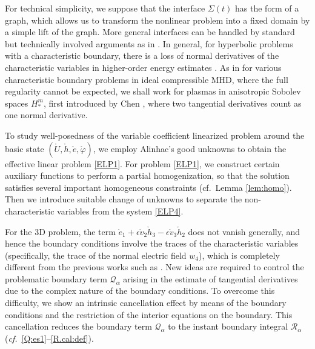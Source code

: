 \documentclass[twoside,11pt]{article}
\numberwithin{equation}{section}
\begin{document}
For technical simplicity, we suppose that the interface $\Sigma(t)$ has the form of a graph, which allows us to transform the nonlinear problem into a fixed domain by a simple lift of the graph. More general interfaces can be handled by standard but technically involved arguments as in \cite[Remark 2.3]{T09CPAMMR2560044}.
In general, for hyperbolic problems with a characteristic boundary, there is a loss of normal derivatives of the characteristic variables in higher-order energy estimates \cite{S96MR1405665,C07MR2289911}.
As in \cite{
	CW08MR2372810, ST13MR3148595,
	LZ23MR4632835,
	T09ARMAMR2481071,YM91MR1092572,TW21MR4201624,TW22aMR4444136,TW22cMR4506578,MSTTY24MR4754746,ST14MR3151094,STW23MR4654316,MSTY23MR4586863} for various characteristic boundary problems in ideal compressible MHD, where the full regularity cannot be expected,
we shall work for plasmas in anisotropic Sobolev spaces $H_*^m$, first introduced by {\sc Chen} \cite{C07MR2289911}, where two tangential derivatives count as one normal derivative.

To study well-posedness of the variable coefficient linearized problem around the basic state $(\mathring{U},\mathring{h},\mathring{e},\mathring{\varphi})$, we employ Alinhac's good unknowns \cite{A89MR976971} to obtain the effective linear problem \eqref{ELP1}.
For problem \eqref{ELP1}, we construct certain auxiliary functions to perform a partial homogenization, so that the solution satisfies several important homogeneous constraints (cf.~Lemma \ref{lem:homo}).
Then we introduce suitable change of unknowns to separate the non-characteristic variables from the system \eqref{ELP4}.

For the 3D problem, the term $\mathring{e}_1+\epsilon\mathring{v}_2\mathring{h}_3-\epsilon\mathring{v}_3\mathring{h}_2$ does not vanish generally, and hence the boundary conditions involve the traces of the characteristic variables (specifically, the trace of the normal electric field $w_4$), %
which is completely different from the previous works such as \cite{CW08MR2372810,CS08MR2423311,FT13MR3044369,LZ23MR4632835,MSTY23MR4586863,MSTTY24MR4754746,ST13MR3148595,ST14MR3151094,STW23MR4654316,T09ARMAMR2481071,T09CPAMMR2560044,T10MR2718711,TW21MR4201624,TW22aMR4444136,TW22cMR4506578,YM91MR1092572}.
New ideas are required to control the problematic boundary term $\mathcal{Q}_{\alpha}$ arising in the estimate of tangential derivatives due to the complex nature of the boundary conditions.
To overcome this difficulty, we show an intrinsic cancellation effect by means of the boundary conditions and
the restriction of the interior equations on the boundary.
This cancellation reduces the boundary term $\mathcal{Q}_{\alpha}$ to
the instant boundary integral $\mathcal{R}_{\alpha}$ ({\it cf.}~\eqref{Q:es1}--\eqref{R.cal:def}).
\end{document}
